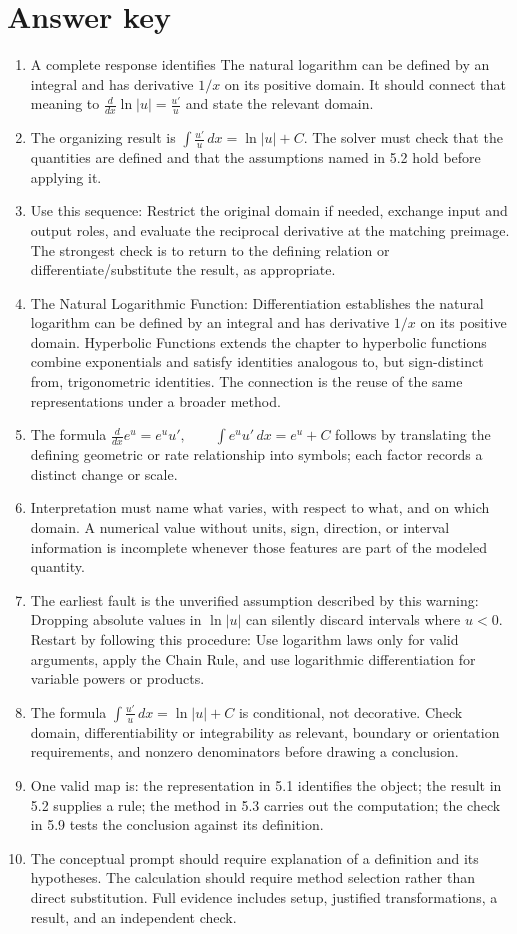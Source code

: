 \documentclass[11pt]{article}
\begin{document}
\section{Answer key}
\small
\begin{enumerate}
\item A complete response identifies The natural logarithm can be defined by an integral and has derivative $1/x$ on its positive domain. It should connect that meaning to \(\frac{d}{dx}\ln|u|=\frac{u'}{u}\) and state the relevant domain.
\item The organizing result is \(\int\frac{u'}{u}\,dx=\ln|u|+C\). The solver must check that the quantities are defined and that the assumptions named in 5.2 hold before applying it.
\item Use this sequence: Restrict the original domain if needed, exchange input and output roles, and evaluate the reciprocal derivative at the matching preimage. The strongest check is to return to the defining relation or differentiate/substitute the result, as appropriate.
\item The Natural Logarithmic Function: Differentiation establishes the natural logarithm can be defined by an integral and has derivative $1/x$ on its positive domain. Hyperbolic Functions extends the chapter to hyperbolic functions combine exponentials and satisfy identities analogous to, but sign-distinct from, trigonometric identities. The connection is the reuse of the same representations under a broader method.
\item The formula \(\frac{d}{dx}e^{u}=e^u u',\qquad \int e^u u'\,dx=e^u+C\) follows by translating the defining geometric or rate relationship into symbols; each factor records a distinct change or scale.
\item Interpretation must name what varies, with respect to what, and on which domain. A numerical value without units, sign, direction, or interval information is incomplete whenever those features are part of the modeled quantity.
\item The earliest fault is the unverified assumption described by this warning: Dropping absolute values in $\ln|u|$ can silently discard intervals where $u<0$. Restart by following this procedure: Use logarithm laws only for valid arguments, apply the Chain Rule, and use logarithmic differentiation for variable powers or products.
\item The formula \(\int\frac{u'}{u}\,dx=\ln|u|+C\) is conditional, not decorative. Check domain, differentiability or integrability as relevant, boundary or orientation requirements, and nonzero denominators before drawing a conclusion.
\item One valid map is: the representation in 5.1 identifies the object; the result in 5.2 supplies a rule; the method in 5.3 carries out the computation; the check in 5.9 tests the conclusion against its definition.
\item The conceptual prompt should require explanation of a definition and its hypotheses. The calculation should require method selection rather than direct substitution. Full evidence includes setup, justified transformations, a result, and an independent check.
\end{enumerate}
\normalsize
\end{document}
